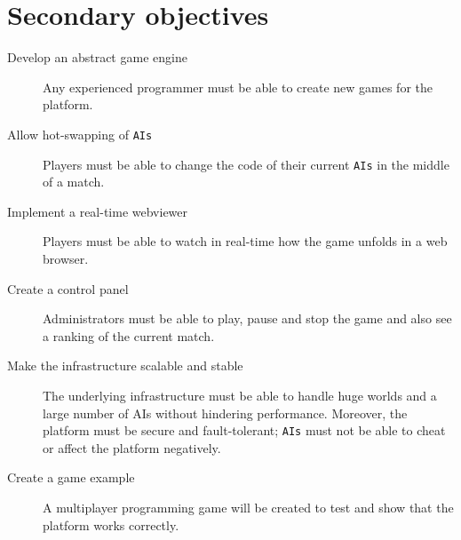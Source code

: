 \documentclass[a4paper,11pt,titlepage,abstract,numbers=noenddot,automark,mnsy,intlimits,rgb,dvipsnames]{report}
\begin{document}
\section{Secondary objectives}
\label{secondary_objectives}
\begin{description}
\item[Develop an abstract game engine]
Any experienced programmer must be able to create new games for the platform.
\item[Allow hot-swapping of \texttt{AIs}]
Players must be able to change the code of their current \texttt{AIs} in the middle of a match.
\item[Implement a real-time webviewer]
Players must be able to watch in real-time how the game unfolds in a web browser.
\item[Create a control panel]
Administrators must be able to play, pause and stop the game and also see a ranking of the current match.
\item[Make the infrastructure scalable and stable]
The underlying infrastructure must be able to handle huge worlds and a large number of \texttt{}AI\texttt{}s without
  hindering performance. Moreover, the platform must be secure and fault-tolerant; \texttt{AIs} must not be able to cheat
  or affect the platform negatively.
\item[Create a game example]
A multiplayer programming game will be created to test and show that the platform works correctly.
\end{description}
\clearpage
\end{document}
